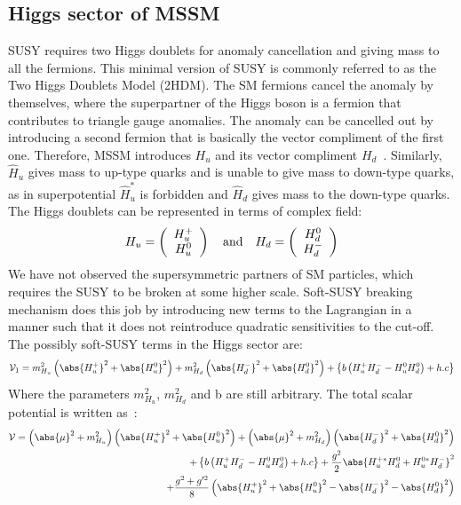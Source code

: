 \subsection{Higgs sector of MSSM}\label{subsec:higgsmssm}
SUSY requires two Higgs doublets for anomaly cancellation and giving mass to all the fermions. This minimal version of SUSY is commonly referred to as the Two Higgs Doublets Model (2HDM). The SM fermions cancel the anomaly by themselves, where the superpartner of the Higgs boson is a fermion that contributes to triangle gauge anomalies. The anomaly can be cancelled out by introducing a second fermion that is basically the vector compliment of the first one. Therefore, MSSM introduces $H_{u}$ and its vector compliment $H_{d}$~\cite{Wells:2009kq}. Similarly, $\hat{H}_{u}$ gives mass to up-type quarks and is unable to give mass to down-type quarks, as in superpotential $\hat{H}_{u}^{*}$ is forbidden and $\hat{H}_{d}$ gives mass to the down-type quarks. The Higgs doublets can be represented in terms of complex field:
\begin{equation}\label{equ:HuHd}
H_{u} = \left(\begin{array}{c}
H^{+}_{u}\\
H^{0}_{u}
\end{array}\right) \quad \textnormal{and} \quad
H_{d} = \left(\begin{array}{c}
H^{0}_{d}\\
H^{-}_{d}
\end{array}\right) 
\end{equation} 
We have not observed the supersymmetric partners of SM particles, which requires the SUSY to be broken at some higher scale. Soft-SUSY breaking mechanism does this job by introducing new terms to the Lagrangian in a manner such that it does not reintroduce quadratic sensitivities to the cut-off. The possibly soft-SUSY terms in the Higgs sector are:
\begin{equation}\label{equ:softsusyHiggs}
\mathcal{V}_{1} = m^{2}_{H_{u}} \left( \abs{H^{+}_{u}}^{2} + \abs{H^{0}_{u}}^{2} \right) + 
m^{2}_{H_{d}} \left( \abs{H^{-}_{d}}^{2} + \abs{H^{0}_{d}}^{2} \right) + 
\left\{ b\left(H^{+}_{u}H^{-}_{d} - H^{0}_{u}H^{0}_{d}\right) + h.c  \right\}
\end{equation} 
Where the parameters $m^{2}_{H_{u}}$, $m^{2}_{H_{d}}$ and b are still arbitrary. The total scalar potential is written as~\cite{phd_thesis:mssm}:
\begin{equation}
\begin{split}
\mathcal{V} = \left(\abs{\mu}^{2} + m^{2}_{H_{u}}\right) \left( \abs{H^{+}_{u}}^{2} + \abs{H^{0}_{u}}^{2} \right)
+\left(\abs{\mu}^{2} + m^{2}_{H_{d}}\right) \left( \abs{H^{-}_{d}}^{2} + \abs{H^{0}_{d}}^{2} \right)\\
+ \left\{ b\left(H^{+}_{u}H^{-}_{d} - H^{0}_{u}H^{0}_{d}\right) + h.c  \right\} +
\frac{g^{2}}{2}\abs{H^{+*}_{u}H^{0}_{d} + H^{0*}_{u}H^{-}_{d}}^{2}\\
+\frac{g^{2}+g'^{2}}{8}\left( \abs{H^{+}_{u}}^{2} + \abs{H^{0}_{u}}^{2} -  \abs{H^{-}_{d}}^{2} - \abs{H^{0}_{d}}^{2}\right)
\end{split}\label{equ:totallagmssm}
\end{equation}

